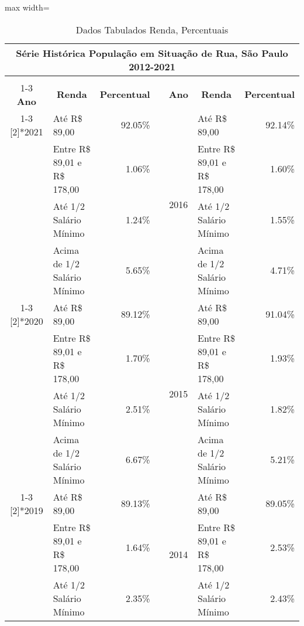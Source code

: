 \documentclass[14pt]{extarticle}
\begin{document}
\begin{table}[htbp]
  \centering
  \caption{Dados Tabulados Renda, Percentuais}
  \tabcolsep=0.15cm
	\renewcommand{\arraystretch}{1.8}
	\begin{adjustbox}{max width=\linewidth}
    \begin{tabular}{clrrclr}
    \toprule
    \multicolumn{7}{c}{Série Histórica População em Situação de Rua, São Paulo 2012-2021} \\
    \midrule
         &      &      &      &      &      &  \\
\cmidrule{1-3}\cmidrule{5-7}    \rowcolor[rgb]{ .906,  .902,  .902} \textbf{Ano} & \multicolumn{1}{c}{\textbf{Renda}} & \multicolumn{1}{c}{\textbf{Percentual}} & \cellcolor[rgb]{ 1,  1,  1} & \textbf{Ano} & \multicolumn{1}{c}{\textbf{Renda}} & \multicolumn{1}{c}{\textbf{Percentual}} \\
\cmidrule{1-3}\cmidrule{5-7}    \multirow{4}[2]{*}{2021} & Até R\$ 89,00 & 92.05\% &      & \multirow{4}[2]{*}{2016} & Até R\$ 89,00 & 92.14\% \\
         & Entre R\$ 89,01 e R\$ 178,00 & 1.06\% &      &      & Entre R\$ 89,01 e R\$ 178,00 & 1.60\% \\
         & Até 1/2 Salário Mínimo & 1.24\% &      &      & Até 1/2 Salário Mínimo & 1.55\% \\
         & Acima de 1/2 Salário Mínimo & 5.65\% &      &      & Acima de 1/2 Salário Mínimo & 4.71\% \\
\cmidrule{1-3}\cmidrule{5-7}    \multirow{4}[2]{*}{2020} & Até R\$ 89,00 & 89.12\% &      & \multirow{4}[2]{*}{2015} & Até R\$ 89,00 & 91.04\% \\
         & Entre R\$ 89,01 e R\$ 178,00 & 1.70\% &      &      & Entre R\$ 89,01 e R\$ 178,00 & 1.93\% \\
         & Até 1/2 Salário Mínimo & 2.51\% &      &      & Até 1/2 Salário Mínimo & 1.82\% \\
         & Acima de 1/2 Salário Mínimo & 6.67\% &      &      & Acima de 1/2 Salário Mínimo & 5.21\% \\
\cmidrule{1-3}\cmidrule{5-7}    \multirow{4}[2]{*}{2019} & Até R\$ 89,00 & 89.13\% &      & \multirow{4}[2]{*}{2014} & Até R\$ 89,00 & 89.05\% \\
         & Entre R\$ 89,01 e R\$ 178,00 & 1.64\% &      &      & Entre R\$ 89,01 e R\$ 178,00 & 2.53\% \\
         & Até 1/2 Salário Mínimo & 2.35\% &      &      & Até 1/2 Salário Mínimo & 2.43\% \\

\end{tabular}
\end{adjustbox}
\end{table}
\end{document}
